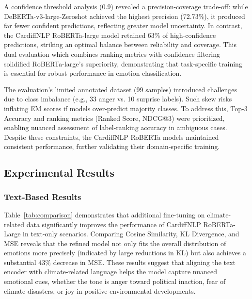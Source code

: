 A confidence threshold analysis (0.9) revealed a precision-coverage trade-off: while DeBERTa-v3-large-Zeroshot achieved the highest precision (72.73\%), it produced far fewer confident predictions, reflecting greater model uncertainty. In contrast, the CardiffNLP RoBERTa-large model retained 63\% of high-confidence predictions, striking an optimal balance between reliability and coverage. This dual evaluation which combines ranking metrics with confidence filtering solidified RoBERTa-large’s superiority, demonstrating that task-specific training is essential for robust performance in emotion classification.
\newline

The evaluation’s limited annotated dataset (99 samples) introduced challenges due to class imbalance (e.g., 33 anger vs. 10 surprise labels). Such skew risks inflating EM scores if models over-predict majority classes. To address this, Top-3 Accuracy and ranking metrics (Ranked Score, NDCG@3) were prioritized, enabling nuanced assessment of label-ranking accuracy in ambiguous cases. Despite these constraints, the CardiffNLP RoBERTa models maintained consistent performance, further validating their domain-specific training.

\subsection{Experimental Results}

\subsubsection*{Text-Based Results}
Table~\ref{tab:comparison} demonstrates that additional fine-tuning on climate-related data significantly improves the performance of CardiffNLP RoBERTa-Large in text-only scenarios. Comparing Cosine Similarity, KL Divergence, and MSE reveals that the refined model not only fits the overall distribution of emotions more precisely (indicated by large reductions in KL) but also achieves a substantial 43\% decrease in MSE. These results suggest that aligning the text encoder with climate-related language helps the model capture nuanced emotional cues, whether the tone is anger toward political inaction, fear of climate disasters, or joy in positive environmental developments.
\newline

